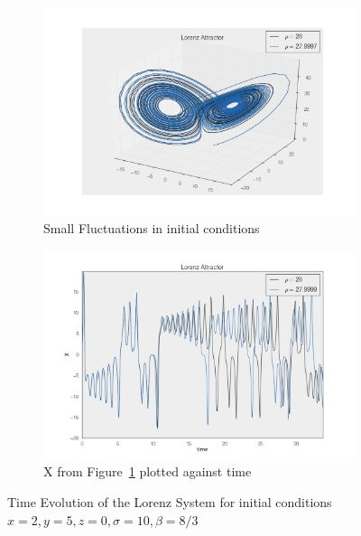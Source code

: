 \documentclass[paper=a4, fontsize=11pt, abstract=on]{scrartcl} %
\numberwithin{equation}{section}
\numberwithin{figure}{section}
\numberwithin{table}{section}
\begin{document}
\begin{figure}
        \begin{subfigure}[b]{0.45\textwidth}
                \includegraphics[width=\textwidth]{lorenzsmallosc}
                \caption{Small Fluctuations in initial conditions}
                \label{fig:lorenzc}
        \end{subfigure}
        \begin{subfigure}[b]{0.45\textwidth}
                \includegraphics[width=\textwidth]{lorenzx}
                \caption{X from Figure~\ref{fig:lorenzc} plotted
                  against time}
                \label{fig:lorenzd}
        \end{subfigure}

        \caption{Time Evolution of the Lorenz System for initial
          conditions $x=2,y=5,z=0,\sigma =10, \beta = 8/3$}\label{fig:lorenz}
\end{figure}
\end{document}
